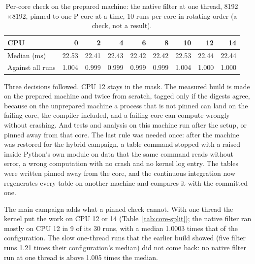 \begin{table}[htbp]
\caption{Per-core check on the prepared machine: the native filter at one
thread, 8192$\times$8192, pinned to one P-core at a time, 10 runs per core
in rotating order (a check, not a result).}
\label{tab:core-check}
\centering\small
\begin{tabular}{lrrrrrrrr}
\toprule
CPU & 0 & 2 & 4 & 6 & 8 & 10 & 12 & 14 \\
\midrule
Median (ms) & 22.53 & 22.41 & 22.43 & 22.42 & 22.42 & 22.53 & 22.44 & 22.44 \\
Against all runs & 1.004 & 0.999 & 0.999 & 0.999 & 0.999 & 1.004 & 1.000 & 1.000 \\
\bottomrule
\end{tabular}
\end{table}

Three decisions followed. CPU 12 stays in the mask. The measured build is
made on the prepared machine and twice from scratch, tagged only if the
digests agree, because on the unprepared machine a process that is not
pinned can land on the failing core, the compiler included, and a failing
core can compute wrongly without crashing. And tests and analysis on this
machine run after the setup, or pinned away from that core. The last rule
was needed once: after the machine was restored for the hybrid campaign, a
table command stopped with a  raised inside Python's own
 module on data that the same command reads without error,
a wrong computation with no crash and no kernel log entry. The tables were
written pinned away from the core, and the continuous integration now
regenerates every table on another machine and compares it with the
committed one.

The main campaign adds what a pinned check cannot. With one thread the
kernel put the work on CPU 12 or 14 (Table~\ref{tab:core-split}); the
native filter ran mostly on CPU 12 in 9 of its 30 runs, with a median
1.0003 times that of the configuration. The slow one-thread runs that the
earlier build showed (five filter runs 1.21 times their configuration's
median) did not come back: no native filter run at one thread is above
1.005 times the median.


